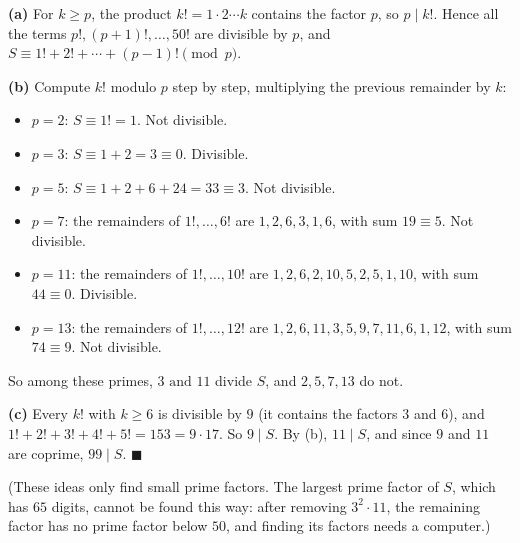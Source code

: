 \textbf{(a)} For $k\ge p$, the product $k!=1\cdot2\cdots k$ contains the factor $p$, so $p\mid k!$. Hence all the terms $p!,(p+1)!,\dots,50!$ are divisible by $p$, and $S\equiv1!+2!+\cdots+(p-1)!\pmod p$.

\textbf{(b)} Compute $k!$ modulo $p$ step by step, multiplying the previous remainder by $k$:
\begin{itemize}
\item $p=2$: $S\equiv1!=1$. Not divisible.
\item $p=3$: $S\equiv1+2=3\equiv0$. Divisible.
\item $p=5$: $S\equiv1+2+6+24=33\equiv3$. Not divisible.
\item $p=7$: the remainders of $1!,\dots,6!$ are $1,2,6,3,1,6$, with sum $19\equiv5$. Not divisible.
\item $p=11$: the remainders of $1!,\dots,10!$ are $1,2,6,2,10,5,2,5,1,10$, with sum $44\equiv0$. Divisible.
\item $p=13$: the remainders of $1!,\dots,12!$ are $1,2,6,11,3,5,9,7,11,6,1,12$, with sum $74\equiv9$. Not divisible.
\end{itemize}
So among these primes, $\boxed{3\text{ and }11}$ divide $S$, and $2,5,7,13$ do not.

\textbf{(c)} Every $k!$ with $k\ge6$ is divisible by $9$ (it contains the factors $3$ and $6$), and $1!+2!+3!+4!+5!=153=9\cdot17$. So $9\mid S$. By (b), $11\mid S$, and since $9$ and $11$ are coprime, $99\mid S$. $\blacksquare$

(These ideas only find small prime factors. The largest prime factor of $S$, which has $65$ digits, cannot be found this way: after removing $3^2\cdot11$, the remaining factor has no prime factor below $50$, and finding its factors needs a computer.)
